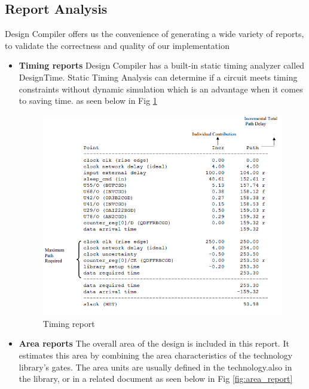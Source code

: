 \documentclass[../main.tex]{subfiles}
\begin{document}
    \subsection{ Report Analysis}
Design Compiler offers us the convenience of generating a wide variety of reports, to validate the correctness and quality of our implementation
   \begin{itemize}
\item \textbf{Timing reports} Design Compiler has a built-in static timing analyzer called DesignTime. Static Timing Analysis 
can determine if a circuit meets timing constraints without dynamic simulation which is an advantage when it comes to saving time.
as seen below in Fig \ref{fig:timing_report}
 \begin{figure}[h!]
\centering
\includegraphics[scale = 0.8]{diagrams/timing_report.PNG}
\caption{Timing report}
\label{fig:timing_report}
\end{figure}

\item \textbf{Area reports} The overall area of the design is included in this report. It estimates this area by combining the area characteristics of the technology library's gates. The area units are usually defined in the technology.also in the library, or in a related document as seen below in Fig \ref{fig:area_report}


\end{itemize}
\end{document}
